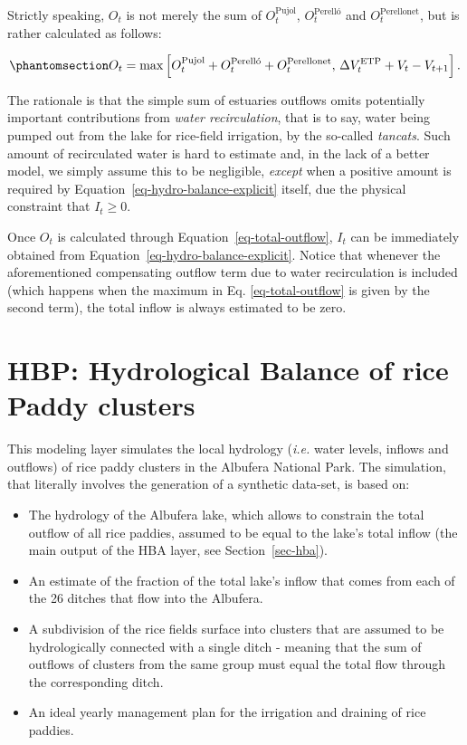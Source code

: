 \documentclass[
  letterpaper,
  DIV=11,
  numbers=noendperiod]{scrreprt}
\providecommand{\tightlist}{%
  \setlength{\itemsep}{0pt}\setlength{\parskip}{0pt}}\usepackage{longtable,booktabs,array}
\begin{document}
Strictly speaking, \(O_t\) is not merely the sum of
\(O_t^{\text{Pujol}}\), \(O_t^{\text{Perelló}}\) and
\(O_t^{\text{Perellonet}}\), but is rather calculated as follows:

\begin{equation}\phantomsection\label{eq-total-outflow}{
O_t = \max
\left[
O_t^{\text{Pujol}} + O_t^{\text{Perelló}} + O_t^{\text{Perellonet}},\, 
\Delta V^{\text {ETP}}_t+V_t-V_{t+1}
\right].
}\end{equation}

The rationale is that the simple sum of estuaries outflows omits
potentially important contributions from \emph{water recirculation},
that is to say, water being pumped out from the lake for rice-field
irrigation, by the so-called \emph{tancats}. Such amount of recirculated
water is hard to estimate and, in the lack of a better model, we simply
assume this to be negligible, \emph{except} when a positive amount is
required by Equation~\ref{eq-hydro-balance-explicit} itself, due the
physical constraint that \(I_t \geq 0\).

Once \(O_t\) is calculated through Equation~\ref{eq-total-outflow},
\(I_t\) can be immediately obtained from
Equation~\ref{eq-hydro-balance-explicit}. Notice that whenever the
aforementioned compensating outflow term due to water recirculation is
included (which happens when the maximum in Eq. \ref{eq-total-outflow}
is given by the second term), the total inflow is always estimated to be
zero.

\section{HBP: Hydrological Balance of rice Paddy
clusters}\label{hbp-hydrological-balance-of-rice-paddy-clusters}

This modeling layer simulates the local hydrology (\emph{i.e.} water
levels, inflows and outflows) of rice paddy clusters in the Albufera
National Park. The simulation, that literally involves the generation of
a synthetic data-set, is based on:

\begin{itemize}
\tightlist
\item
  The hydrology of the Albufera lake, which allows to constrain the
  total outflow of all rice paddies, assumed to be equal to the lake's
  total inflow (the main output of the HBA layer, see
  Section~\ref{sec-hba}).
\item
  An estimate of the fraction of the total lake's inflow that comes from
  each of the 26 ditches that flow into the Albufera.
\item
  A subdivision of the rice fields surface into clusters that are
  assumed to be hydrologically connected with a single ditch - meaning
  that the sum of outflows of clusters from the same group must equal
  the total flow through the corresponding ditch.
\item
  An ideal yearly management plan for the irrigation and draining of
  rice paddies.
\end{itemize}
\end{document}
